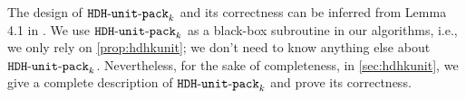 The design of $\operatorname{\mathtt{HDH-unit-pack}}_{k}$ and its correctness can be inferred from
Lemma 4.1 in \cite{caprara2008}.
We use $\operatorname{\mathtt{HDH-unit-pack}}_{k}$ as a black-box subroutine in our algorithms,
i.e., we only rely on \cref{prop:hdhkunit};
we don't need to know anything else about $\operatorname{\mathtt{HDH-unit-pack}}_{k}$.
Nevertheless, for the sake of completeness, in \cref{sec:hdhkunit},
we give a complete description of $\operatorname{\mathtt{HDH-unit-pack}}_{k}$ and prove its correctness.
